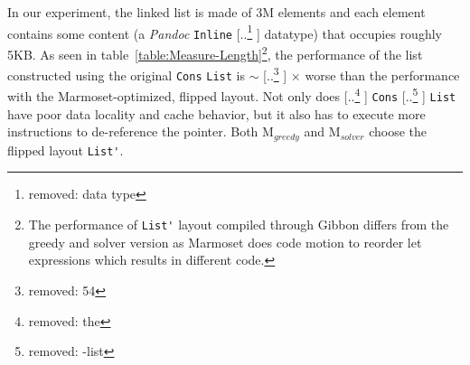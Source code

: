 \documentclass[acmsmall,review,anonymous]{acmart}\settopmatter{printfolios=true,printccs=false,printacmref=false}
\newcommand{\system}{{\sc Marmoset}\xspace}
\newcommand{\systemSolver}{{\sc M$_{\mathit{solver}}$}\xspace} %
\newcommand{\systemGreedy}{{\sc M$_{\mathit{greedy}}$}\xspace} %
\newcommand{\gibbon}{{\sc Gibbon}\xspace}
\providecommand{\DIFaddtex}[1]{{\protect\color{blue} \sf #1}} %
\providecommand{\DIFdeltex}[1]{{\protect\color{red} [..\footnote{removed: #1} ]}} %
\providecommand{\DIFaddbegin}{} %
\providecommand{\DIFaddend}{} %
\providecommand{\DIFdelbegin}{} %
\providecommand{\DIFdelend}{} %
\providecommand{\DIFadd}[1]{\texorpdfstring{\DIFaddtex{#1}}{#1}} %
\providecommand{\DIFdel}[1]{\texorpdfstring{\DIFdeltex{#1}}{}} %
\newcommand{\DIFscaledelfig}{0.5}
\newlength{\DIFdelgraphicswidth} %
\newlength{\DIFdelgraphicsheight} %
\newcommand{\DIFaddincludegraphics}[2][]{{\color{blue}\fbox{\DIFOincludegraphics[#1]{#2}}}} %
\newcommand{\DIFdelincludegraphics}[2][]{%
\sbox{\DIFdelgraphicsbox}{\DIFOincludegraphics[#1]{#2}}%
\settoboxwidth{\DIFdelgraphicswidth}{\DIFdelgraphicsbox} %
\settoboxtotalheight{\DIFdelgraphicsheight}{\DIFdelgraphicsbox} %
\scalebox{\DIFscaledelfig}{%
\parbox[b]{\DIFdelgraphicswidth}{\usebox{\DIFdelgraphicsbox}\\[-\baselineskip] \rule{\DIFdelgraphicswidth}{0em}}\llap{\resizebox{\DIFdelgraphicswidth}{\DIFdelgraphicsheight}{%
\setlength{\unitlength}{\DIFdelgraphicswidth}%
\begin{picture}(1,1)%
\thicklines\linethickness{2pt} %
{\color[rgb]{1,0,0}\put(0,0){\framebox(1,1){}}}%
{\color[rgb]{1,0,0}\put(0,0){\line( 1,1){1}}}%
{\color[rgb]{1,0,0}\put(0,1){\line(1,-1){1}}}%
\end{picture}%
}\hspace*{3pt}}} %
} %
\DeclareRobustCommand{\DIFaddbegin}{\DIFOaddbegin \let\includegraphics\DIFaddincludegraphics} %
\DeclareRobustCommand{\DIFaddend}{\DIFOaddend \let\includegraphics\DIFOincludegraphics} %
\DeclareRobustCommand{\DIFdelbegin}{\DIFOdelbegin \let\includegraphics\DIFdelincludegraphics} %
\DeclareRobustCommand{\DIFdelend}{\DIFOaddend \let\includegraphics\DIFOincludegraphics} %
\begin{document}
In our experiment, the linked list is made of 3M elements and each element contains some
content (a \textit{Pandoc} \lstinline|Inline| \DIFdelbegin \DIFdel{data type}\DIFdelend \DIFaddbegin \DIFadd{datatype}\DIFaddend ) that occupies roughly 5KB.
As seen in table~\ref{table:Measure-Length}\DIFaddbegin \footnote{\DIFadd{The performance of }{\color{blue}%
\lstinline|List'| %
}%
\DIFadd{layout compiled through }\gibbon \DIFadd{differs from the greedy and solver version as }\system \DIFadd{does code motion to reorder let expressions which results in different code.}}\DIFaddend , the performance of the list constructed using the original \DIFdelbegin %
{\color{red}%
\lstinline{Cons} %
}%
\DIFdelend \DIFaddbegin {\color{blue}%
\lstinline{List} %
}%
\DIFaddend is $\sim$\DIFdelbegin \DIFdel{54}\DIFdelend \DIFaddbegin \DIFadd{60}\DIFaddend $\times$ worse than the performance with the \system-optimized, flipped layout.
Not only does \DIFdelbegin \DIFdel{the }%
{\color{red}%
\lstinline{Cons}%
}%
\DIFdel{-list }\DIFdelend \DIFaddbegin {\color{blue}%
\lstinline{List} %
}%
\DIFaddend have poor data locality and cache behavior,
but it also has to execute more instructions to de-reference the pointer.
Both \systemGreedy and \systemSolver choose the flipped layout \lstinline|List'|.
\end{document}
